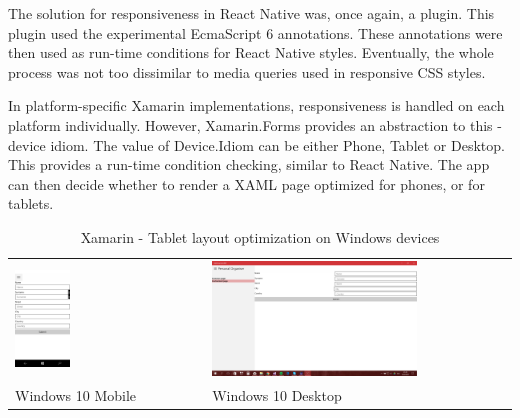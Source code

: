 \documentclass[english,master,public,dept460,male,cpdeclaration,oneside]{diploma}
\begin{document}
The solution for responsiveness in React Native was, once again, a plugin. This plugin used the experimental EcmaScript 6 annotations. These annotations were then used as run-time conditions for React Native styles. Eventually, the whole process was not too dissimilar to media queries used in responsive CSS styles.

In platform-specific Xamarin implementations, responsiveness is handled on each platform individually. However, Xamarin.Forms provides an abstraction to this - device idiom. The value of Device.Idiom can be either Phone, Tablet or Desktop. This provides a run-time condition checking, similar to React Native. The app can then decide whether to render a XAML page optimized for phones, or for tablets.

\begin{table}[!h]
	\centering
	\caption{Xamarin - Tablet layout optimization on Windows devices}
	\label{table:xamarin6}
	\begin{tabular}{p{5cm} | p{11cm}  }
		\toprule		
		\includegraphics[width=0.3\textwidth]{Figures/xamarin6windows.PNG}
		& \includegraphics[width=0.7\textwidth]{Figures/xamarin6winx.PNG}
		\\
		Windows 10 Mobile & Windows 10 Desktop \\
		\midrule
	\end{tabular}
\end{table}
\end{document}
